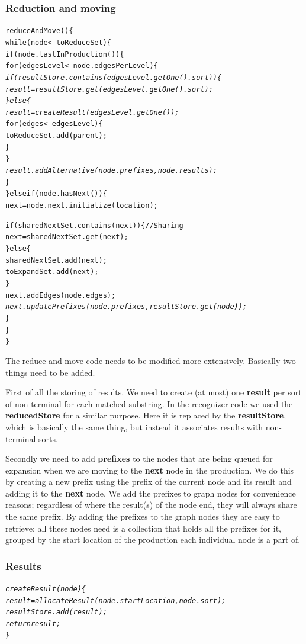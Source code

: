 \documentclass[a4paper,10pt]{article}
\begin{document}
\pagebreak
\subsubsection{Reduction and moving}
{\small
\begin{alltt}
reduceAndMove()\{
  while(node <- toReduceSet)\{
    if(node.lastInProduction())\{
      for(edgesLevel <- node.edgesPerLevel)\{\textit{
        if(resultStore.contains(edgesLevel.getOne().sort))\{
          result = resultStore.get(edgesLevel.getOne().sort);
        \}else\{
          result = createResult(edgesLevel.getOne());}
          for(edges <- edgesLevel)\{
            toReduceSet.add(parent);
          \}
        \}\textit{
        result.addAlternative(node.prefixes, node.results);}
      \}
    \}else if(node.hasNext())\{
      next = node.next.initialize(location);
      
      if(sharedNextSet.contains(next))\{ // Sharing
        next = sharedNextSet.get(next);
      \}else\{
        sharedNextSet.add(next);
        toExpandSet.add(next);
      \}
      next.addEdges(node.edges);\textit{
      next.updatePrefixes(node.prefixes, resultStore.get(node));}
    \}
  \}
\}
\end{alltt}
}

The reduce and move code needs to be modified more extensively. Basically two things need to be added.

First of all the storing of results. We need to create (at most) one {\bf result} per sort of non-terminal for each matched substring. In the recognizer code we used the {\bf reducedStore} for a similar purpose. Here it is replaced by the {\bf resultStore}, which is basically the same thing, but instead it associates results with non-terminal sorts.

Secondly we need to add {\bf prefixes} to the nodes that are being queued for expansion when we are moving to the {\bf next} node in the production. We do this by creating a new prefix using the prefix of the current node and its result and adding it to the {\bf next} node. We add the prefixes to graph nodes for convenience reasons; regardless of where the result(s) of the node end, they will always share the same prefix. By adding the prefixes to the graph nodes they are easy to retrieve; all these nodes need is a collection that holds all the prefixes for it, grouped by the start location of the production each individual node is a part of.

\pagebreak
\subsubsection{Results}
{\small
\begin{alltt}
\textit{createResult(node)\{
  result = allocateResult(node.startLocation, node.sort);
  resultStore.add(result);
  return result;
\}}
\end{alltt}
}
\end{document}

